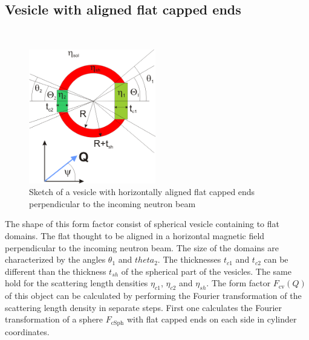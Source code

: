 \clearpage
\subsection{Vesicle with aligned flat capped ends \cite{Kaya:aj5008,Kaya:aj5016}}
\label{sect:vesicle_capped_poles_aligned} ~\\

\begin{figure}[htb]
\begin{center}
\includegraphics[width=0.492\textwidth,height=0.523\textwidth]{vesicle_capped_poles_aligned.png}
\end{center}
\caption{Sketch of a vesicle with horizontally aligned flat
capped ends perpendicular to the incoming neutron beam}
\label{fig:Sketch_vesicle_capped_poles_aligned}
\end{figure}
The shape of this form factor consist of spherical vesicle containing to flat domains.
The flat thought to be aligned in a horizontal magnetic field perpendicular to the incoming
neutron beam. The size of the domains are characterized by the angles $\theta_1$ and
$theta_2$. The thicknesses $t_{c1}$ and $t_{c2}$ can be different than the thickness $t_{sh}$
of the spherical part of the vesicles. The same hold for the scattering length densities
$\eta_{c1}$, $\eta_{c2}$ and $\eta_{sh}$. The form factor $F_\text{cv}(Q)$ of this object can be
calculated by performing the Fourier transformation of the scattering length density in separate
steps. First one calculates the Fourier transformation of a sphere $F_\text{cSph}$
with flat capped ends on each side in cylinder coordinates.
